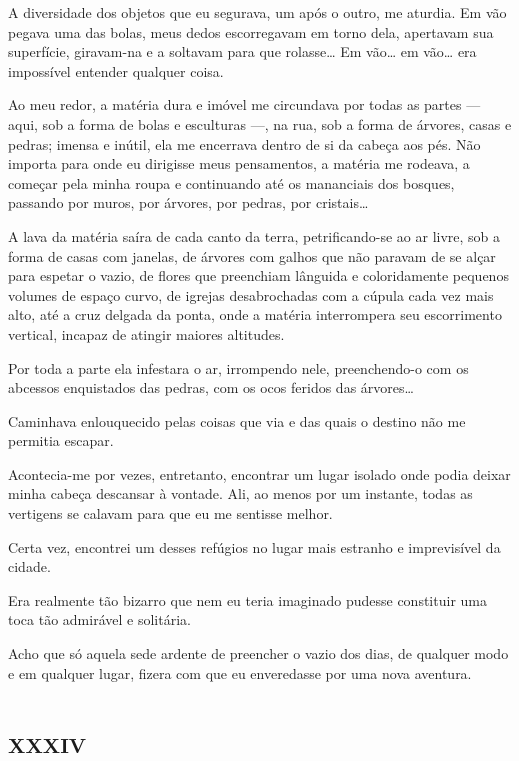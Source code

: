 A diversidade dos objetos que eu segurava, um após o outro, me aturdia. Em vão pegava uma das bolas, meus dedos escorregavam em torno dela, apertavam sua superfície, giravam-na e a soltavam para que rolasse\ldots{} Em vão\ldots{} em vão\ldots{} era impossível entender qualquer coisa.

Ao meu redor, a matéria dura e imóvel me circundava por todas as partes --- aqui, sob a forma de bolas e esculturas ---, na rua, sob a forma de árvores, casas e pedras; imensa e inútil, ela me encerrava dentro de si da cabeça aos pés. Não importa para onde eu dirigisse meus pensamentos, a matéria me rodeava, a começar pela minha roupa e continuando até os mananciais dos bosques, passando por muros, por árvores, por pedras, por cristais\ldots{}

A lava da matéria saíra de cada canto da terra, petrificando-se ao ar livre, sob a forma de casas com janelas, de árvores com galhos que não paravam de se alçar para espetar o vazio, de flores que preenchiam lânguida e coloridamente pequenos volumes de espaço curvo, de igrejas desabrochadas com a cúpula cada vez mais alto, até a cruz delgada da ponta, onde a matéria interrompera seu escorrimento vertical, incapaz de atingir maiores altitudes.

Por toda a parte ela infestara o ar, irrompendo nele, preenchendo-o com os abcessos enquistados das pedras, com os ocos feridos das árvores\ldots{}

Caminhava enlouquecido pelas coisas que via e das quais o destino não me permitia escapar.

Acontecia-me por vezes, entretanto, encontrar um lugar isolado onde podia deixar minha cabeça descansar à vontade. Ali, ao menos por um instante, todas as vertigens se calavam para que eu me sentisse melhor.

Certa vez, encontrei um desses refúgios no lugar mais estranho e imprevisível da cidade.

Era realmente tão bizarro que nem eu teria imaginado pudesse constituir uma toca tão admirável e solitária.

Acho que só aquela sede ardente de preencher o vazio dos dias, de qualquer modo e em qualquer lugar, fizera com que eu enveredasse por uma nova aventura.


\chapter*{\huge\centering\textsc{xxxiv}}

